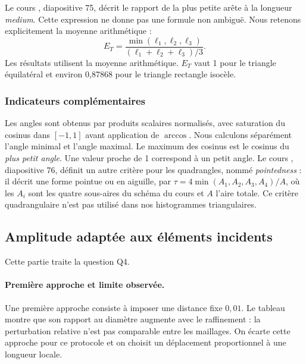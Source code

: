 \documentclass[12pt,a4paper]{article}
\newcommand{\tabfont}{\fontsize{11pt}{13.2pt}\selectfont\setlength{\tabcolsep}{4pt}}
\newcommand{\resulttable}[2]{\begin{table}[htbp]\centering\tabfont\caption{#2}\end{table}}
\begin{document}
Le cours \cite{mesh}, diapositive 75, décrit le rapport de la plus petite arête à la longueur \emph{medium}. Cette expression ne donne pas une formule non ambiguë. Nous retenons explicitement la moyenne arithmétique :
\begin{equation*}
E_T=\frac{\min(\ell_1,\ell_2,\ell_3)}{(\ell_1+\ell_2+\ell_3)/3}.
\end{equation*}
Les résultats utilisent la moyenne arithmétique. $E_T$ vaut 1 pour le triangle équilatéral et environ 0,87868 pour le triangle rectangle isocèle.

\subsubsection{Indicateurs complémentaires}
Les angles sont obtenus par produits scalaires normalisés, avec saturation du cosinus dans $[-1,1]$ avant application de $\arccos$. Nous calculons séparément l'angle minimal et l'angle maximal. Le maximum des cosinus est le cosinus du \emph{plus petit angle}. Une valeur proche de 1 correspond à un petit angle. Le cours \cite{mesh}, diapositive 76, définit un autre critère pour les quadrangles, nommé \emph{pointedness} : il décrit une forme pointue ou en aiguille, par $\tau=4\min(A_1,A_2,A_3,A_4)/A$, où les $A_i$ sont les quatre sous-aires du schéma du cours et $A$ l'aire totale. Ce critère quadrangulaire n'est pas utilisé dans nos histogrammes triangulaires.

\subsection{Amplitude adaptée aux éléments incidents}
Cette partie traite la question Q4.

\paragraph{Première approche et limite observée.}
Une première approche consiste à imposer une distance fixe $0,01$. Le tableau montre que son rapport au diamètre augmente avec le raffinement : la perturbation relative n'est pas comparable entre les maillages. On écarte cette approche pour ce protocole et on choisit un déplacement proportionnel à une longueur locale.
\resulttable{displacement_scaling.tex}{Effet du raffinement sur une distance de déplacement fixe de 0,01, sur les maillages réguliers.}
\end{document}
